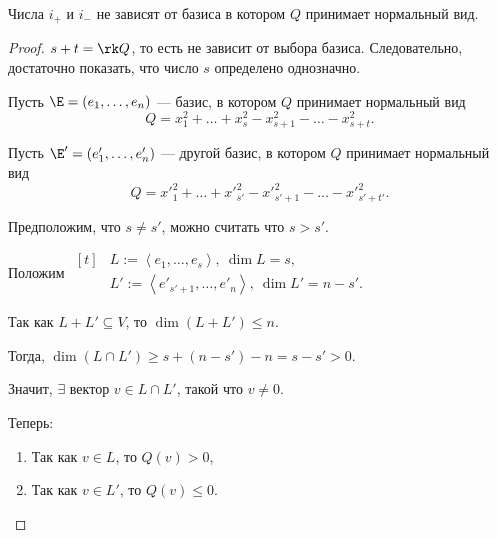\documentclass[a4paper]{article}
\begin{document}
\begin{colloq}
            \begin{theorem}
                Числа $i_+$ и $i_-$ не зависят от базиса в котором $Q$ принимает нормальный вид.
            \end{theorem}

            \begin{proof}
                $s + t = \rk Q$, то есть не зависит от выбора базиса. Следовательно, достаточно показать, что число $s$ определено однозначно.

                Пусть $\E = (e_1, \dots, e_n)$ --- базис, в котором $Q$ принимает нормальный вид
                \begin{equation*}
                    Q = x_1^2 + \dots + x_s ^2 - x_{s + 1}^2 - \dots - x_{s + t}^2
                .\end{equation*}

                Пусть $\E' = (e'_1, \dots, e'_n)$ --- другой базис, в котором $Q$ принимает нормальный вид
                \begin{equation*}
                    Q = x'^2_1 + \dots + x'^2_{s'} - x'^2_{s' + 1} - \dots - x'^2_{s' + t'}
                .\end{equation*}

                Предположим, что $s \neq s'$, можно считать что $s > s'$.

                Положим 
                \begin{math}
                    \begin{aligned}[t]
                        &L := \left< e_1, \dots, e_s \right>, \ \dim L = s, \\
                        &L' := \left< e'_{s' + 1}, \dots, e'_n \right>, \ \dim L' = n - s'.
                    \end{aligned}
                \end{math}

                \bigskip
                Так как $L + L' \subseteq V$, то $\dim \left(L + L'\right) \leq n$.

                Тогда, $\dim \left(L \cap L'\right) \geq s + (n - s') - n = s - s' > 0$.

                \bigskip
                Значит, $\exists$ вектор $v \in L \cap L'$, такой что $v \neq 0$.

                Теперь: 
                \begin{enumerate}[nosep]
                    \item Так как $v \in L$, то $Q(v) > 0$,
                    \item Так как $v \in L'$, то $Q(v) \leq 0$.
                \end{enumerate}
             

\end{proof}
\end{colloq}
\end{document}
